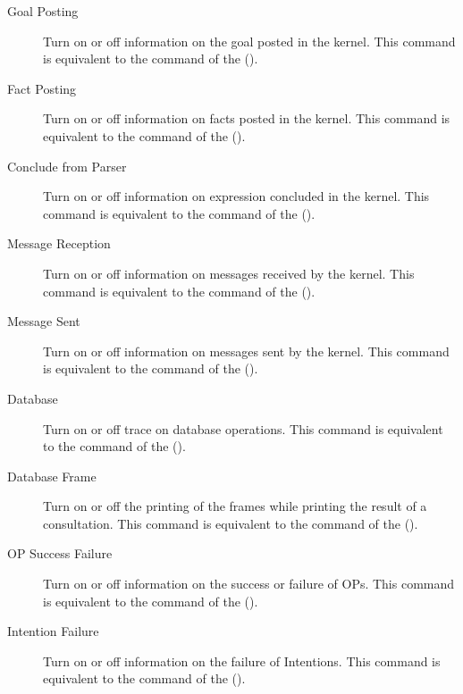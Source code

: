 \begin{description}

\item[Goal Posting] Turn on or off information on the goal posted in
the kernel. This command is equivalent to the 
command of the \CPK{} ().

\item[Fact Posting] Turn on or off information on facts posted in
the kernel. This command is equivalent to the 
command of the \CPK{} ().

\item[Conclude from Parser] Turn on or off information on expression concluded
in the kernel. This command is equivalent to the 
command of the \CPK{} ().

\item[Message Reception] Turn on or off information on messages
received by the kernel. This command is equivalent to the  command of the \CPK{} ().

\item[Message Sent] Turn on or off information on messages sent by
the kernel. This command is equivalent to the 
command of the \CPK{} ().

\item[Database] Turn on or off trace on database operations. This
command is equivalent to the  command of the \CPK{}
().

\item[Database Frame] Turn on or off the printing of the frames while
printing the result of a consultation. This command is equivalent to the
 command of the \CPK{} ().

\item[OP Success Failure] Turn on or off information on the success
or failure of OPs. This command is equivalent to the  command of the \CPK{} ().

\item[Intention Failure] Turn on or off information on the failure of
Intentions. This command is equivalent to the  command of the \CPK{} ().


\end{description}
